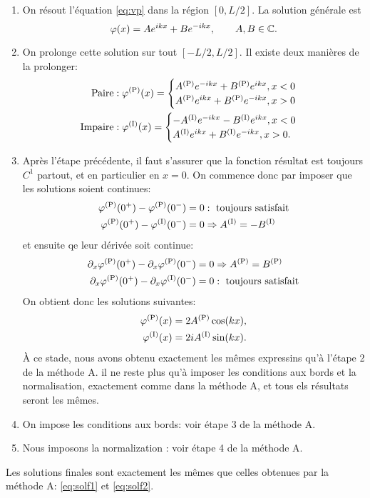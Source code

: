 \documentclass[11pt,a4paper,oneside]{article}
\begin{document}
\begin{enumerate}
    \item On résout l'équation \eqref{eq:vp} dans la région $[0,L/2]$. La solution générale est
    \begin{equation}
        \varphi(x)=Ae^{ikx}+Be^{-ikx},\qquad A,B\in\mathbb{C}.
    \end{equation}
    \item On prolonge cette solution sur tout $[-L/2,L/2]$. Il existe deux manières de la prolonger:
    \begin{align}
        \text{Paire} &: \varphi^{(\text{P})}(x)=
        \begin{cases}
            A^{(\text{P})} e^{-ikx}+B^{(\text{P})} e^{ikx}, x<0\\
            A^{(\text{P})} e^{ikx}+B^{(\text{P})} e^{-ikx}, x>0
        \end{cases}\\
        \text{Impaire} &: \varphi^{(\text{I})}(x)=
        \begin{cases}
            -A^{(\text{I})} e^{-ikx}-B^{(\text{I})} e^{ikx}, x<0\\
            A^{(\text{I})} e^{ikx}+B^{(\text{I})} e^{-ikx}, x>0.
        \end{cases}
    \end{align}
    \item Après l'étape précédente, il faut s'assurer que la fonction résultat est toujours $C^1$ partout, et en particulier en $x=0$. On commence donc par imposer que les solutions soient continues:
    \begin{align}
        \varphi^{(\text{P})}(0^+)-\varphi^{(\text{P})}(0^-)&=0 : \text{ toujours satisfait}\\
        \varphi^{(\text{P})}(0^+)-\varphi^{(\text{I})}(0^-)&=0 \Rightarrow A^{(\text{I})} = -B^{(\text{I})}
    \end{align}
    et ensuite qe leur dérivée soit continue:
    \begin{align}
        \partial_x\varphi^{(\text{P})}(0^+)-\partial_x\varphi^{(\text{P})}(0^-)&=0 \Rightarrow A^{(\text{P})} = B^{(\text{P})}\\
        \partial_x\varphi^{(\text{P})}(0^+)-\partial_x\varphi^{(\text{I})}(0^-)&=0 : \text{ toujours satisfait}
    \end{align}
    On obtient donc les solutions suivantes:
    \begin{align}
        \varphi^{(\text{P})}(x) &= 2A^{(\text{P})}\cos(kx),\\
        \varphi^{(\text{I})}(x) &= 2iA^{(\text{I})}\sin(kx).
    \end{align}
    À ce stade, nous avons obtenu exactement les mêmes expressins qu'à l'étape 2 de la méthode A. il ne reste plus qu'à imposer les conditions aux bords et la normalisation, exactement comme dans la méthode A, et tous els résultats seront les mêmes.
    \item On impose les conditions aux bords: voir étape 3 de la méthode A.
    \item Nous imposons la normalization : voir étape 4 de la méthode A.
\end{enumerate}
Les solutions finales sont exactement les mêmes que celles obtenues par la méthode A: \eqref{eq:solf1} et \eqref{eq:solf2}.
\end{document}

